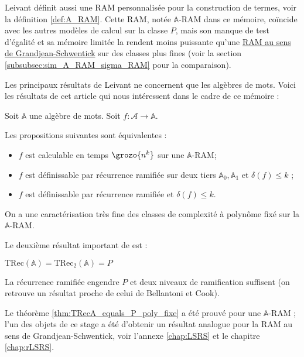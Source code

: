 \documentclass{report}
\newcommand{\bbA}{\mathbb{A}}
\newcommand{\TRec}[1]{\text{TRec}\left(\mathbb{#1}\right)}
\newcommand{\TRecd}[1]{\text{TRec}_{2}\left(\mathbb{#1}\right)}
\begin{document}
			
			Leivant définit aussi une RAM personnalisée pour la construction de termes, voir la définition \ref{def:A_RAM}. Cette RAM, notée $\bbA$-RAM dans ce mémoire, coïncide avec les autres modèles de calcul sur la classe $P$, mais son manque de test d'égalité et sa mémoire limitée la rendent moins puissante qu'une \hyperref[def:sigma_RAM]{RAM au sens de Grandjean-Schwentick} \cite{GrandjeanSchwentick2002} sur des classes plus fines (voir la section \ref{subsubsec:sim_A_RAM_sigma_RAM} pour la comparaison).
			
			\espace
			
			Les principaux résultats de Leivant ne concernent que les algèbres de mots. Voici les résultats de cet article \cite{Leivant1995} qui nous intéressent dans le cadre de ce mémoire :
			
			\begin{theorem}
				\label{thm:TRecA_equals_P_poly_fixe}
				Soit $\bbA$ une algèbre de mots. Soit $f : \mathcal{A} \to \bbA $.
				
				Les propositions suivantes sont équivalentes :
	
				\begin{itemize}[itemsep=-1mm]
					\item 	$f$ est calculable en temps $\grozo{n^k}$ sur une $\bbA$-RAM;
					\item 	$f$ est définissable par récurrence ramifiée sur deux tiers $\bbA_0, \bbA_1$ et $\delta(f) \leq k$ ;
					\item 	$f$ est définissable par récurrence ramifiée et $\delta(f) \leq k$.
				\end{itemize}
			\end{theorem}
			
			On a une caractérisation très fine des classes de complexité à polynôme fixé sur la $\bbA$-RAM.
			
			Le deuxième résultat important de \cite{Leivant1995} est :
			
			\begin{theorem}
				\label{thm:TRecA_equals_P}
				$\TRec{A} = \TRecd{A} = P$
			\end{theorem}
			
			La récurrence ramifiée engendre $P$ et deux niveaux de ramification suffisent (on retrouve un résultat proche de celui de Bellantoni et Cook).
		
			Le théorème \ref{thm:TRecA_equals_P_poly_fixe} a été prouvé pour une $\bbA$-RAM ; l'un des objets de ce stage a été d'obtenir un résultat analogue pour la RAM au sens de Grandjean-Schwentick, voir l'annexe \ref{chap:LSRS} et le chapitre \ref{chap:rLSRS}.
			
\end{document}
